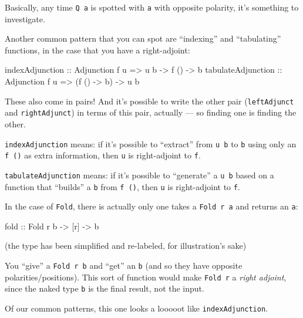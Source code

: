 \documentclass[]{article}
\newenvironment{Shaded}{}{}
\newcommand{\DataTypeTok}[1]{\textcolor[rgb]{0.56,0.13,0.00}{#1}}
\newcommand{\NormalTok}[1]{#1}
\newcommand{\OtherTok}[1]{\textcolor[rgb]{0.00,0.44,0.13}{#1}}
\begin{document}
Basically, any time \texttt{Q\ a} is spotted with \texttt{a} with opposite
polarity, it's something to investigate.

Another common pattern that you can spot are ``indexing'' and ``tabulating''
functions, in the case that you have a right-adjoint:

\begin{Shaded}
\begin{Highlighting}[]
\OtherTok{indexAdjunction    ::} \DataTypeTok{Adjunction}\NormalTok{ f u }\OtherTok{=>}\NormalTok{ u b }\OtherTok{{-}>}\NormalTok{ f () }\OtherTok{{-}>}\NormalTok{ b}
\OtherTok{tabulateAdjunction ::} \DataTypeTok{Adjunction}\NormalTok{ f u }\OtherTok{=>}\NormalTok{ (f () }\OtherTok{{-}>}\NormalTok{ b) }\OtherTok{{-}>}\NormalTok{ u b}
\end{Highlighting}
\end{Shaded}

These also come in pairs! And it's possible to write the other pair
(\texttt{leftAdjunct} and \texttt{rightAdjunct}) in terms of this pair, actually
--- so finding one is finding the other.

\texttt{indexAdjunction} means: if it's possible to ``extract'' from
\texttt{u\ b} to \texttt{b} using only an \texttt{f\ ()} as extra information,
then \texttt{u} is right-adjoint to \texttt{f}.

\texttt{tabulateAdjunction} means: if it's possible to ``generate'' a
\texttt{u\ b} based on a function that ``builds'' a \texttt{b} from
\texttt{f\ ()}, then \texttt{u} is right-adjoint to \texttt{f}.

In the case of \texttt{Fold}, there is actually only one takes a
\texttt{Fold\ r\ a} and returns an \texttt{a}:

\begin{Shaded}
\begin{Highlighting}[]
\OtherTok{fold ::} \DataTypeTok{Fold}\NormalTok{ r b }\OtherTok{{-}>}\NormalTok{ [r] }\OtherTok{{-}>}\NormalTok{ b}
\end{Highlighting}
\end{Shaded}

(the type has been simplified and re-labeled, for illustration's sake)

You ``give'' a \texttt{Fold\ r\ b} and ``get'' an \texttt{b} (and so they have
opposite polarities/positions). This sort of function would make
\texttt{Fold\ r} a \emph{right adjoint}, since the naked type \texttt{b} is the
final result, not the input.

Of our common patterns, this one looks a looooot like \texttt{indexAdjunction}.
\end{document}
